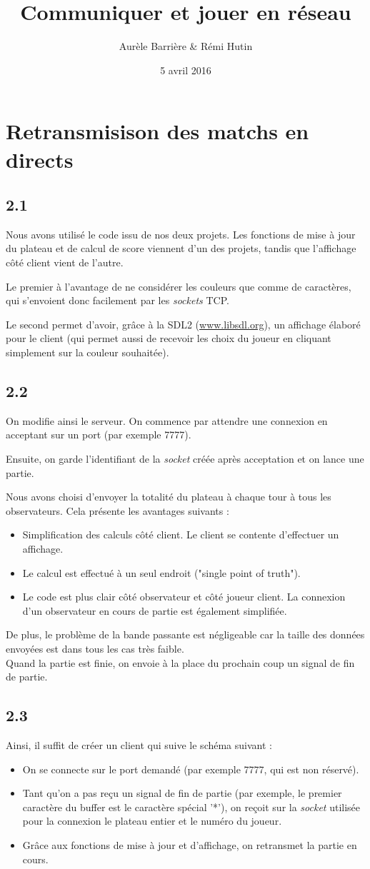 \documentclass[12pt]{article}
\title{Communiquer et jouer en réseau}
\author{Aurèle Barrière \& Rémi Hutin}
\date{5 avril 2016}
\def\question#1{\subsection{#1}}
\def\sec#1{\section{#1}}
\begin{document}
\maketitle
\tableofcontents

\sec{Retransmisison des matchs en directs}
\question{2.1}
Nous avons utilisé le code issu de nos deux projets. Les fonctions de mise à jour du plateau et de calcul de score viennent d'un des projets, tandis que l'affichage côté client vient de l'autre.

Le premier à l'avantage de ne considérer les couleurs que comme de caractères, qui s'envoient donc facilement par les \textit{sockets} TCP.

Le second permet d'avoir, grâce à la SDL2 (\url{www.libsdl.org}), un affichage élaboré pour le client (qui permet aussi de recevoir les choix du joueur en cliquant simplement sur la couleur souhaitée).




\question{2.2}
On modifie ainsi le serveur. On commence par attendre une connexion en acceptant sur un port (par exemple 7777).

Ensuite, on garde l'identifiant de la \textit{socket} créée après acceptation et on lance une partie.

Nous avons choisi d'envoyer la totalité du plateau à chaque tour à tous les observateurs. Cela présente les avantages suivants :
\begin{itemize}
\item Simplification des calculs côté client. Le client se contente d'effectuer un affichage.
\item Le calcul est effectué à un seul endroit ("single point of truth").
\item Le code est plus clair côté observateur et côté joueur client. La connexion d'un observateur en cours de partie est également simplifiée.
\end{itemize}
De plus, le problème de la bande passante est négligeable car la taille des données envoyées est dans tous les cas très faible. \\

Quand la partie est finie, on envoie à la place du prochain coup un signal de fin de partie.


\question{2.3}
Ainsi, il suffit de créer un client qui suive le schéma suivant :
\begin{itemize}
\item On se connecte sur le port demandé (par exemple 7777, qui est non réservé).
\item Tant qu'on a pas reçu un signal de fin de partie (par exemple, le premier caractère du buffer est le caractère spécial '*'), on reçoit sur la \textit{socket} utilisée pour la connexion le plateau entier et le numéro du joueur.
\item Grâce aux fonctions de mise à jour et d'affichage, on retransmet la partie en cours.
\end{itemize}
\end{document}
